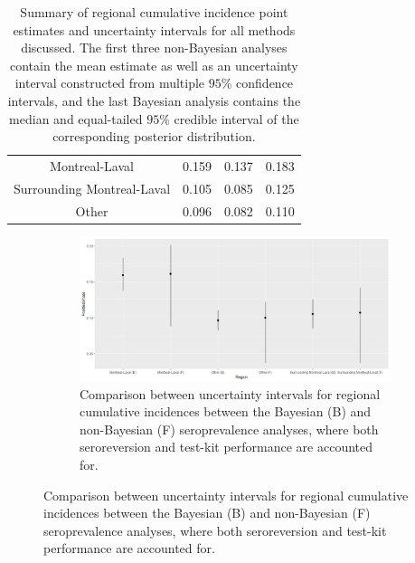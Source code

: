 \begin{table}[]
\begin{tabular}{c|ccc}
Montreal-Laval             & 0.159               & 0.137                  & 0.183                  \\
Surrounding Montreal-Laval & 0.105               & 0.085                  & 0.125                  \\
Other                      & 0.096               & 0.082                  & 0.110                 
\end{tabular}
\caption{Summary of regional cumulative incidence point estimates and uncertainty intervals for all methods discussed. The first three non-Bayesian analyses contain the mean estimate as well as an uncertainty interval constructed from multiple $95$\% confidence intervals, and the last Bayesian analysis contains the median and equal-tailed $95$\% credible interval of the corresponding posterior distribution.}
\end{table}

\captionsetup[subfigure]{labelformat=empty}
\begin{figure}[ht!]
\centering
\begin{subfigure}[b]{\columnwidth} 
    \includegraphics[width=\columnwidth]{../../plot/intervals.png}
    \caption{Comparison between uncertainty intervals for regional cumulative incidences between the Bayesian (B) and non-Bayesian (F) seroprevalence analyses, where both seroreversion and test-kit performance are accounted for.}
    \label{fig:intervals}
\end{subfigure}
\end{figure}